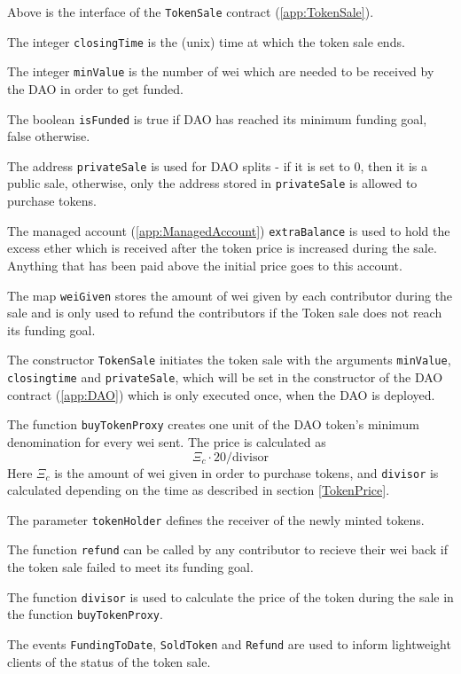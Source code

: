 \documentclass[9pt,oneside]{amsart}
\begin{document}
\begin{multicols}{2}
Above is the interface of the \verb|TokenSale| contract (\ref{app:TokenSale}). 

The integer \verb|closingTime| is the (unix) time at which the token sale ends.

The integer \verb|minValue| is the number of wei which are needed to be received by the DAO in order to get funded.

The boolean \verb|isFunded| is true if DAO has reached its minimum funding goal, false otherwise.

The address \verb|privateSale| is used for DAO splits - if it is set to 0, then it is a public sale, otherwise, only the address stored in \verb|privateSale| is allowed to purchase tokens.

The managed account (\ref{app:ManagedAccount}) \verb|extraBalance| is used to hold the excess ether which is received after the token price is increased during the sale. Anything that has been paid above the initial price goes to this account.

The map \verb|weiGiven| stores the amount of wei given by each contributor during the sale and is only used to refund the contributors if the Token sale does not reach its funding goal.

The constructor \verb|TokenSale| initiates the token sale with the arguments \verb|minValue|, \verb|closingtime| and \verb|privateSale|, which will be set in the constructor of the DAO contract (\ref{app:DAO}) which is only executed once, when the DAO is deployed. 

The function \verb|buyTokenProxy| creates one unit of the DAO token’s minimum denomination for every wei sent. The price is calculated as $$\Xi_c \cdot 20 / \text{divisor}$$ Here $\Xi_c$ is the amount of wei given in order to purchase tokens, and \verb|divisor| is calculated depending on the time as described in section \ref{TokenPrice}.

The parameter \verb|tokenHolder| defines the receiver of the newly minted tokens. 

The function \verb|refund| can be called by any contributor to recieve their wei back if the token sale failed to meet its funding goal.

The function \verb|divisor| is used to calculate the price of the token during the sale in the function \verb|buyTokenProxy|.

The events \verb|FundingToDate|, \verb|SoldToken| and \verb|Refund| are used to inform lightweight clients of the status of the token sale.
\end{multicols}
\end{document}
